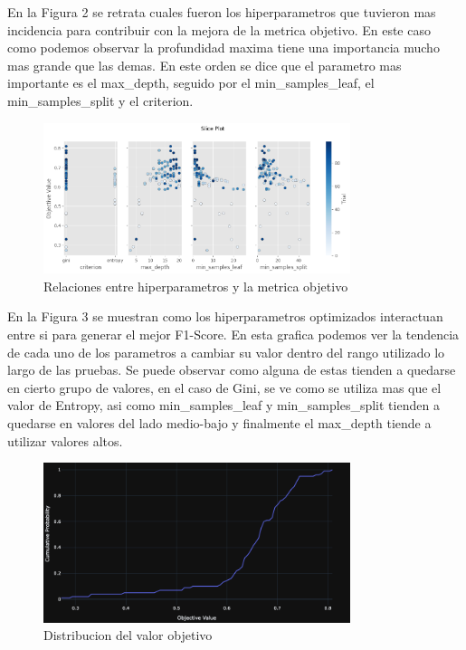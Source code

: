 \documentclass[12pt,a4paper]{article}
\begin{document}
En la Figura 2 se retrata cuales fueron los hiperparametros que tuvieron mas incidencia para contribuir
con la mejora de la metrica objetivo. En este caso como podemos observar la profundidad maxima tiene una
importancia mucho mas grande que las demas.
En este orden se dice que el parametro mas importante es el max_depth,
seguido por el min_samples_leaf, el min_samples_split y el criterion.

\begin{figure}[H]
  \centering
  \includegraphics[width=0.8\textwidth]{../img/SliceDecisionTree.png}
  \caption{Relaciones entre hiperparametros y la metrica objetivo}\label{fig:decison-tree-slice}
\end{figure}

En la Figura 3 se muestran como los hiperparametros optimizados interactuan entre si para generar el mejor F1-Score.
En esta grafica podemos ver la tendencia de cada uno de los parametros
a cambiar su valor dentro del rango utilizado lo largo de las pruebas.
Se puede observar como alguna de estas tienden a quedarse en cierto grupo de valores,
en el caso de Gini, se ve como se utiliza mas que el valor de Entropy, asi como min_samples_leaf y min_samples_split
tienden a quedarse en valores del lado medio-bajo y finalmente el max_depth tiende a utilizar valores altos.

\begin{figure}[H]
  \centering
  \includegraphics[width=0.8\textwidth]{../img/EDFDecisionTree.png}
  \caption{Distribucion del valor objetivo}\label{fig:edf-decision-tree}
\end{figure}
\end{document}

